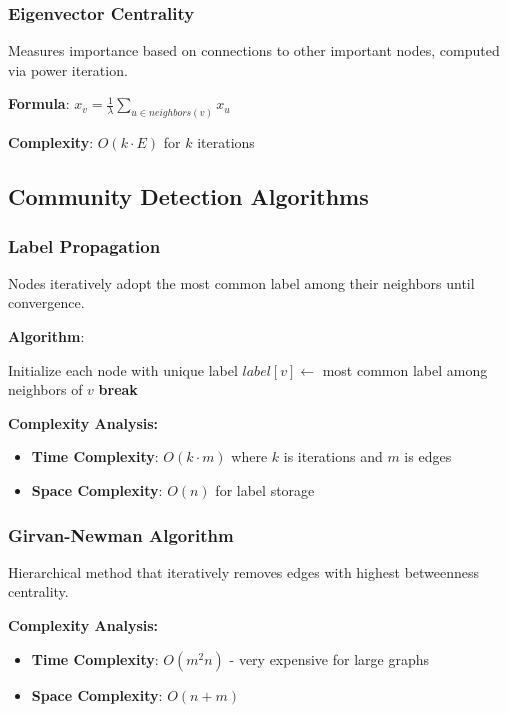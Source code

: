 \documentclass[12pt,a4paper]{article}
\begin{document}
\subsubsection{Eigenvector Centrality}
Measures importance based on connections to other important nodes, computed via power iteration.

\textbf{Formula}: $x_v = \frac{1}{\lambda} \sum_{u \in neighbors(v)} x_u$

\textbf{Complexity}: $O(k \cdot E)$ for $k$ iterations

\subsection{Community Detection Algorithms}

\subsubsection{Label Propagation}
Nodes iteratively adopt the most common label among their neighbors until convergence.

\textbf{Algorithm}:
\begin{algorithmic}[1]
\State Initialize each node with unique label
        \State $label[v] \gets$ most common label among neighbors of $v$
    \EndFor
        \State \textbf{break}
    \EndIf
\EndFor
\end{algorithmic}

\textbf{Complexity Analysis:}
\begin{itemize}
    \item \textbf{Time Complexity}: $O(k \cdot m)$ where $k$ is iterations and $m$ is edges
    \item \textbf{Space Complexity}: $O(n)$ for label storage
\end{itemize}

\subsubsection{Girvan-Newman Algorithm}
Hierarchical method that iteratively removes edges with highest betweenness centrality.

\textbf{Complexity Analysis:}
\begin{itemize}
    \item \textbf{Time Complexity}: $O(m^2 n)$ - very expensive for large graphs
    \item \textbf{Space Complexity}: $O(n + m)$
\end{itemize}
\end{document}
